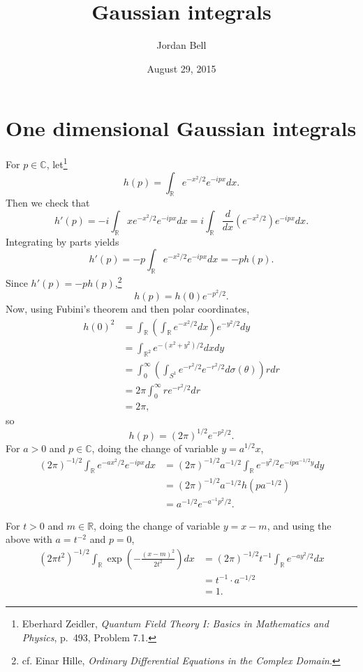 \documentclass{article}
\theoremstyle{definition}
\begin{document}
\title{Gaussian integrals}
\author{Jordan Bell}
\date{August 29, 2015}

\maketitle

\section{One dimensional Gaussian integrals}
For $p \in \mathbb{C}$, let\footnote{Eberhard Zeidler,
{\em Quantum Field Theory I: Basics in Mathematics and Physics},
p.~493, Problem 7.1.}
\[
h(p) = \int_{\mathbb{R}} e^{-x^2/2} e^{-ipx} dx.
\]
Then we check that
\[
h'(p) = -i \int_{\mathbb{R}} x e^{-x^2/2} e^{-ipx} dx = i\int_{\mathbb{R}} \frac{d}{dx} \left( e^{-x^2/2} \right)
e^{-ipx} dx.
\]
Integrating by parts yields
\[
h'(p) = -p \int_{\mathbb{R}} e^{-x^2/2} e^{-ipx} dx = -p h(p).
\]
Since $h'(p)=-p h(p)$,\footnote{cf. Einar Hille, {\em Ordinary Differential Equations in the Complex Domain}.}
\[
h(p) = h(0) e^{-p^2/2}.
\]
Now, using Fubini's theorem and then polar coordinates,
\begin{align*}
h(0)^2 &= \int_{\mathbb{R}} \left( \int_{\mathbb{R}} e^{-x^2/2} dx\right) e^{-y^2/2} dy\\
&=\int_{\mathbb{R}^2} e^{-(x^2+y^2)/2} dxdy\\
&=\int_0^\infty \left( \int_{S^1} e^{-r^2/2} e^{-r^2/2} d\sigma(\theta) \right) r dr\\
&=2\pi \int_0^\infty r e^{-r^2/2} dr\\
&=2\pi,
\end{align*}
so
\[
h(p) = (2\pi)^{1/2} e^{-p^2/2}.
\]
For $a>0$ and $p \in \mathbb{C}$, doing the change of variable $y = a^{1/2} x$,
\begin{align*}
(2\pi)^{-1/2} \int_{\mathbb{R}} e^{-ax^2/2} e^{-ipx} dx&=(2\pi)^{-1/2} a^{-1/2} \int_{\mathbb{R}} e^{-y^2/2} e^{-ipa^{-1/2} y} dy\\
&=(2\pi)^{-1/2} a^{-1/2} h(pa^{-1/2})\\
&=a^{-1/2} e^{-a^{-1} p^2 /2}.
\end{align*}

For $t>0$ and $m \in \mathbb{R}$, doing the change of variable $y=x-m$, and using the above with $a=t^{-2}$ and $p=0$,
\begin{align*}
(2\pi t^2)^{-1/2} \int_{\mathbb{R}} \exp\left(-\frac{(x-m)^2}{2t^2}\right) dx&=(2\pi)^{-1/2}  t^{-1} \int_{\mathbb{R}} e^{-ay^2/2} dx\\
&=t^{-1} \cdot a^{-1/2}\\
&=1.
\end{align*}
\end{document}
